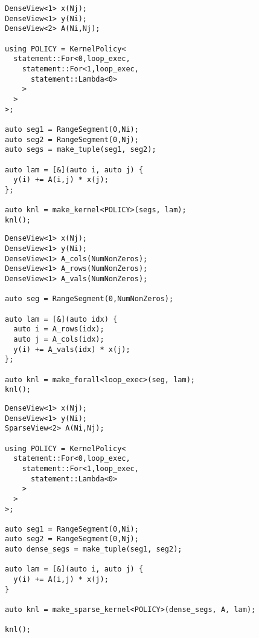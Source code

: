 \begin{figure}
\begin{lstlisting}[caption={RAJA implementation of dense matrix vector multiplication.},label=DenseMV]
DenseView<1> x(Nj);
DenseView<1> y(Ni);
DenseView<2> A(Ni,Nj);

using POLICY = KernelPolicy<
  statement::For<0,loop_exec,
    statement::For<1,loop_exec,
      statement::Lambda<0>
    >
  >
>;

auto seg1 = RangeSegment(0,Ni);
auto seg2 = RangeSegment(0,Nj);
auto segs = make_tuple(seg1, seg2);

auto lam = [&](auto i, auto j) {
  y(i) += A(i,j) * x(j);
};

auto knl = make_kernel<POLICY>(segs, lam);
knl();
\end{lstlisting}
\end{figure}
\begin{figure}
\begin{lstlisting}[caption={RAJA implementation of sparse matrix vector multiplication, specialized for COO storage.},label=SpecializedMV]
DenseView<1> x(Nj);
DenseView<1> y(Ni);
DenseView<1> A_cols(NumNonZeros);
DenseView<1> A_rows(NumNonZeros);
DenseView<1> A_vals(NumNonZeros);

auto seg = RangeSegment(0,NumNonZeros);

auto lam = [&](auto idx) {
  auto i = A_rows(idx);
  auto j = A_cols(idx);
  y(i) += A_vals(idx) * x(j);
};

auto knl = make_forall<loop_exec>(seg, lam);
knl();
\end{lstlisting}
\end{figure}
\begin{figure}
\begin{lstlisting}[caption={Implementation of SpMV using the SparseRAJA prototype},label=SparseRAJAMV]
DenseView<1> x(Nj);
DenseView<1> y(Ni);
SparseView<2> A(Ni,Nj);

using POLICY = KernelPolicy<
  statement::For<0,loop_exec,
    statement::For<1,loop_exec,
      statement::Lambda<0>
    >
  >
>;

auto seg1 = RangeSegment(0,Ni);
auto seg2 = RangeSegment(0,Nj);
auto dense_segs = make_tuple(seg1, seg2);

auto lam = [&](auto i, auto j) {
  y(i) += A(i,j) * x(j);
}

auto knl = make_sparse_kernel<POLICY>(dense_segs, A, lam);
  
knl();
\end{lstlisting}
\end{figure}




